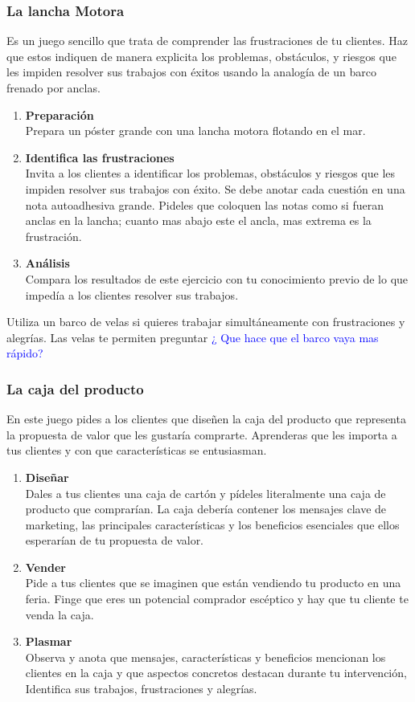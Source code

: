 \documentclass[11pt]{book}
\begin{document}
\subsubsection{La lancha Motora}
Es un juego sencillo que trata de comprender las frustraciones de tu clientes. Haz que estos indiquen de manera explicita los problemas, obstáculos, y riesgos que les impiden resolver sus trabajos con éxitos usando la analogía de un barco frenado por anclas.
\begin{enumerate}
\item \textbf{ Preparación }\\
Prepara un póster grande con una lancha motora flotando en el mar.
\item \textbf{ Identifica las frustraciones }\\
Invita a los clientes a identificar los problemas, obstáculos y riesgos que les impiden resolver sus trabajos con éxito. Se debe anotar cada cuestión en una nota autoadhesiva grande. Pideles que coloquen las notas como si fueran anclas en la lancha; cuanto mas abajo este el ancla, mas extrema es la frustración.
\item \textbf{ Análisis }\\
Compara los resultados de este ejercicio con tu conocimiento previo de lo que impedía a los clientes resolver sus trabajos.
\end{enumerate}
Utiliza un barco de velas si quieres trabajar simultáneamente con frustraciones y alegrías. Las velas te permiten preguntar \textcolor{blue}{¿ Que hace que el barco vaya mas rápido?}
\subsubsection{La caja del producto}
En este juego pides a los clientes que diseñen la caja del producto que representa la propuesta de valor que les gustaría comprarte. Aprenderas que les importa a tus clientes y con que características se entusiasman.
\begin{enumerate}
\item \textbf{ Diseñar }\\
Dales a tus clientes una caja de cartón y pídeles literalmente una caja de producto que comprarían. La caja debería contener los mensajes clave de marketing, las principales características y los beneficios esenciales que ellos esperarían de tu propuesta de valor.
\item \textbf{ Vender }\\
Pide a tus clientes que se imaginen que están vendiendo tu producto en una feria. Finge que eres un potencial comprador escéptico y hay que tu cliente te venda la caja.
\item \textbf{ Plasmar }\\
Observa y anota que mensajes, características y beneficios mencionan los clientes en la caja y que aspectos concretos destacan durante tu intervención, Identifica sus trabajos, frustraciones y alegrías.
\end{enumerate}
\end{document}
